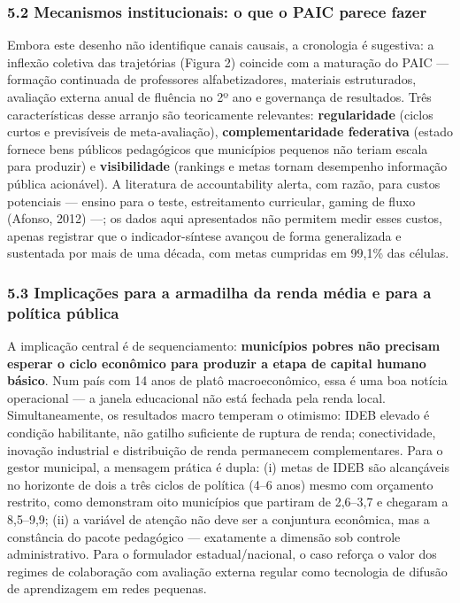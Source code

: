 \documentclass[
  brazilian,
  12pt,
  a4paper,
]{article}
\begin{document}
\subsubsection{5.2 Mecanismos institucionais: o que o PAIC parece
fazer}\label{mecanismos-institucionais-o-que-o-paic-parece-fazer}

Embora este desenho não identifique canais causais, a cronologia é
sugestiva: a inflexão coletiva das trajetórias (Figura 2) coincide com a
maturação do PAIC --- formação continuada de professores
alfabetizadores, materiais estruturados, avaliação externa anual de
fluência no 2º ano e governança de resultados. Três características
desse arranjo são teoricamente relevantes: \textbf{regularidade} (ciclos
curtos e previsíveis de meta-avaliação), \textbf{complementaridade
federativa} (estado fornece bens públicos pedagógicos que municípios
pequenos não teriam escala para produzir) e \textbf{visibilidade}
(rankings e metas tornam desempenho informação pública acionável). A
literatura de accountability alerta, com razão, para custos potenciais
--- ensino para o teste, estreitamento curricular, gaming de fluxo
(Afonso, 2012) ---; os dados aqui apresentados não permitem medir esses
custos, apenas registrar que o indicador-síntese avançou de forma
generalizada e sustentada por mais de uma década, com metas cumpridas em
99,1\% das células.

\subsubsection{5.3 Implicações para a armadilha da renda média e para a
política
pública}\label{implicauxe7uxf5es-para-a-armadilha-da-renda-muxe9dia-e-para-a-poluxedtica-puxfablica}

A implicação central é de sequenciamento: \textbf{municípios pobres não
precisam esperar o ciclo econômico para produzir a etapa de capital
humano básico}. Num país com 14 anos de platô macroeconômico, essa é uma
boa notícia operacional --- a janela educacional não está fechada pela
renda local. Simultaneamente, os resultados macro temperam o otimismo:
IDEB elevado é condição habilitante, não gatilho suficiente de ruptura
de renda; conectividade, inovação industrial e distribuição de renda
permanecem complementares. Para o gestor municipal, a mensagem prática é
dupla: (i) metas de IDEB são alcançáveis no horizonte de dois a três
ciclos de política (4--6 anos) mesmo com orçamento restrito, como
demonstram oito municípios que partiram de 2,6--3,7 e chegaram a
8,5--9,9; (ii) a variável de atenção não deve ser a conjuntura
econômica, mas a constância do pacote pedagógico --- exatamente a
dimensão sob controle administrativo. Para o formulador
estadual/nacional, o caso reforça o valor dos regimes de colaboração com
avaliação externa regular como tecnologia de difusão de aprendizagem em
redes pequenas.
\end{document}
